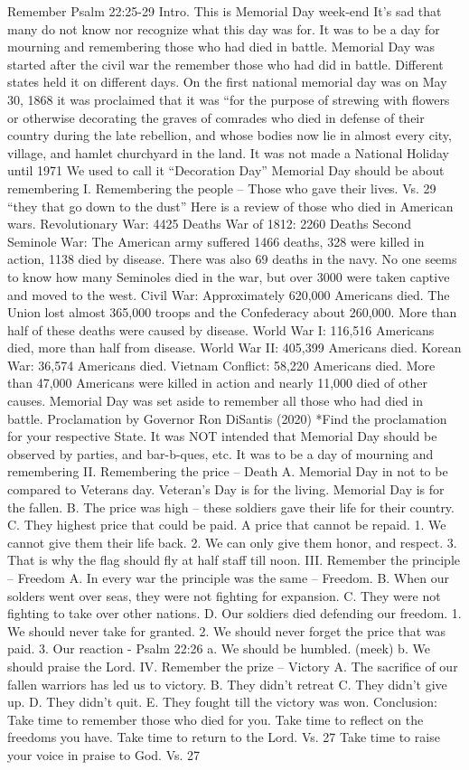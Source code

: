 Remember
Psalm 22:25-29
Intro.
This is Memorial Day week-end
It’s sad that many do not know nor recognize what this day
was for.
It was to be a day for mourning and remembering those
who had died in battle.
Memorial Day was started after the civil war the remember
those who had did in battle.
Different states held it on different days.
On the first national memorial day was on May 30, 1868 it was proclaimed that it was “for the purpose of strewing with flowers or otherwise decorating the graves of comrades who died in defense of their country during the late rebellion, and whose bodies now lie in almost every city, village, and hamlet churchyard in the land.
It was not made a National Holiday until 1971
We used to call it “Decoration Day”
Memorial Day should be about remembering
I. Remembering the people – Those who gave their lives.
Vs. 29 “they that go down to the dust”
Here is a review of those who died in American wars.
Revolutionary War: 4425 Deaths
War of 1812: 2260 Deaths
Second Seminole War: The American army suffered 1466 deaths, 328 were killed in action, 1138 died by disease. There was also 69 deaths in the navy.
No one seems to know how many Seminoles died in the war, but over 3000 were taken captive and moved to the west.
Civil War: Approximately 620,000 Americans
died. The Union lost almost 365,000 troops and the
Confederacy about 260,000. More than half of these deaths were caused by disease.
World War I: 116,516 Americans died, more than half from disease.
World War II: 405,399 Americans died.
Korean War: 36,574 Americans died.
Vietnam Conflict: 58,220 Americans died. More than
47,000 Americans were killed in action and nearly 11,000 died of other causes.
Memorial Day was set aside to remember all those who had died in battle.
Proclamation by Governor Ron DiSantis (2020)
*Find the proclamation for your respective State.
It was NOT intended that Memorial Day should be
observed by parties, and bar-b-ques, etc.
It was to be a day of mourning and remembering
II. Remembering the price – Death
A. Memorial Day in not to be compared to Veterans day.
Veteran’s Day is for the living.
Memorial Day is for the fallen.
B. The price was high – these soldiers gave their life for
their country.
C. They highest price that could be paid. A price that cannot be repaid.
1. We cannot give them their life back.
2. We can only give them honor, and respect.
3. That is why the flag should fly at half staff till noon.
III. Remember the principle – Freedom
A. In every war the principle was the same – Freedom.
B. When our solders went over seas, they were not fighting
for expansion.
C. They were not fighting to take over other nations.
D. Our soldiers died defending our freedom.
1. We should never take for granted.
2. We should never forget the price that was paid.
3. Our reaction - Psalm 22:26
a. We should be humbled. (meek)
b. We should praise the Lord.
IV. Remember the prize -- Victory
A. The sacrifice of our fallen warriors has led us to victory.
B. They didn’t retreat
C. They didn’t give up.
D. They didn’t quit.
E. They fought till the victory was won.
Conclusion:
Take time to remember those who died for you.
Take time to reflect on the freedoms you have.
Take time to return to the Lord. Vs. 27
Take time to raise your voice in praise to God. Vs. 27